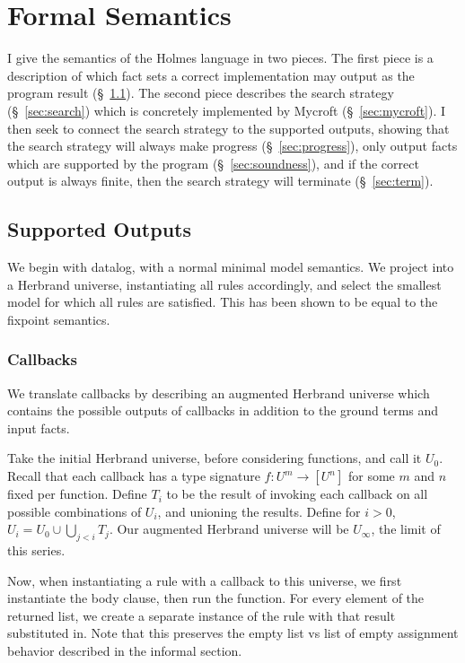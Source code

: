 \section{Formal Semantics}
\label{sec:formal}
I give the semantics of the Holmes language in two pieces.
The first piece is a description of which fact sets a correct implementation may output as the program result (\S~\ref{sec:allowed}).
The second piece describes the search strategy (\S~\ref{sec:search}) which is concretely implemented by Mycroft (\S~\ref{sec:mycroft}).
I then seek to connect the search strategy to the supported outputs, showing that the search strategy will always make progress (\S~\ref{sec:progress}), only output facts which are supported by the program (\S~\ref{sec:soundness}), and if the correct output is always finite, then the search strategy will terminate (\S~\ref{sec:term}).
\subsection{Supported Outputs}
\label{sec:allowed}
We begin with datalog, with a normal minimal model semantics.
We project into a Herbrand universe, instantiating all rules accordingly, and select the smallest model for which all rules are satisfied.
This has been shown to be equal to the fixpoint semantics.

\subsubsection{Callbacks}
We translate callbacks by describing an augmented Herbrand universe which contains the possible outputs of callbacks in addition to the ground terms and input facts.

Take the initial Herbrand universe, before considering functions, and call it $U_0$.
Recall that each callback has a type signature $f : U^m \rightarrow [U^n]$ for some $m$ and $n$ fixed per function.
Define $T_i$ to be the result of invoking each callback on all possible combinations of $U_i$, and unioning the results.
Define for $i > 0$, $U_i = U_0 \cup \bigcup_{j < i} T_j$.
Our augmented Herbrand universe will be $U_\infty$, the limit of this series.

Now, when instantiating a rule with a callback to this universe, we first instantiate the body clause, then run the function.
For every element of the returned list, we create a separate instance of the rule with that result substituted in.
Note that this preserves the empty list vs list of empty assignment behavior described in the informal section.

